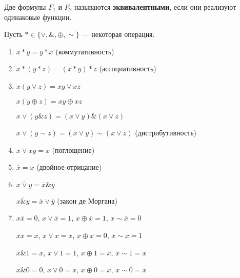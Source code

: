 \begin{definition}
Две формулы $F_1$ и $F_2$ называются {\bf эквивалентными}, если они реализуют одинаковые функции.
\end{definition}

Пусть $\ast \in \{\vee, \&, \oplus, \sim \}$ --- некоторая операция.

\begin{enumerate}
	\item 
		$x \ast y = y \ast x$ (коммутативность)
	\item 
		$x \ast (y \ast z) = (x \ast y) \ast z$ (ассоциативность)
	\item 
		$x (y \vee z) = xy \vee xz$

		$x (y \oplus z) = xy \oplus xz$

		$x \vee (y  \&  z) = (x \vee y) \& (x \vee z)$

		$x \vee (y  \sim  z) = (x \vee y) \sim (x \vee z)$ (дистрибутивность)
	\item
		$x \vee xy = x$ (поглощение)
	\item 
		$\overline{\overline{x}} = x$ (двойное отрицание)
	\item 
		$\overline{x \vee y} = \overline{x} \& \overline{y}$

		$\overline{x \& y} = \overline{x} \vee \overline{y}$ (закон де Моргана)
	\item 
		$x\overline{x} = 0$, \smallskip $x \vee \overline{x} = 1$, \smallskip $x \oplus \overline{x} = 1$, \smallskip $x \sim \overline{x} = 0$

		$xx = x$, \smallskip $x \vee x = x$, \smallskip $x \oplus x = 0$, \smallskip $x \sim x = 1$

		$x \& 1 = x$, \smallskip $x \vee 1 = 1$, \smallskip $x \oplus 1 = \overline{x}$, \smallskip $x \sim 1 = x$

		$x \& 0 = 0$, \smallskip $x \vee 0 = x$, \smallskip $x \oplus 0 = x$, \smallskip $x \sim 0 = \overline{x}$
\end{enumerate}
